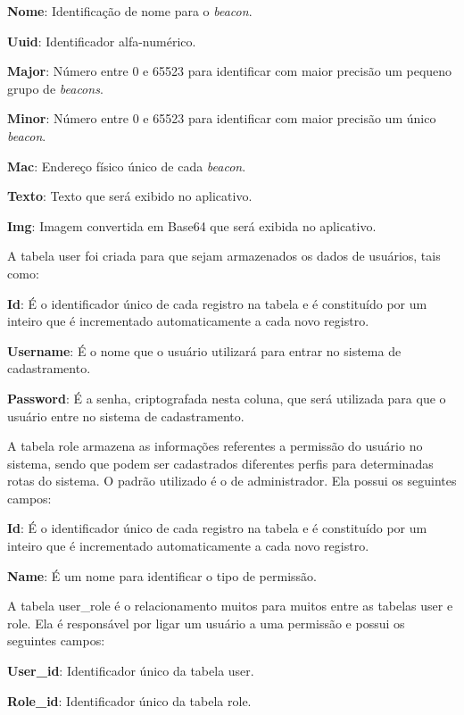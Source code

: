 \textbf{Nome}: Identificação de nome para o
\textit{beacon}.

\textbf{Uuid}: Identificador alfa-numérico.

\textbf{Major}: Número entre 0 e 65523 para identificar com maior precisão um pequeno grupo de \textit{beacons}.

\textbf{Minor}: Número entre 0 e 65523 para identificar com maior precisão um único \textit{beacon}.

\textbf{Mac}: Endereço físico único de cada \textit{beacon}.

\textbf{Texto}: Texto que será exibido no aplicativo.

\textbf{Img}: Imagem convertida em Base64 que será exibida no aplicativo.

A tabela user foi criada para que sejam armazenados os dados de usuários, tais como:

\textbf{Id}: É o identificador único de cada registro na tabela e é constituído por um inteiro que é incrementado automaticamente a cada novo registro.

\textbf{Username}: É o nome que o usuário utilizará para entrar no sistema de cadastramento.

\textbf{Password}: É a senha, criptografada nesta coluna, que será utilizada para que o usuário entre no sistema de cadastramento.

A tabela role armazena as informações referentes a permissão do usuário no sistema, sendo que podem ser cadastrados diferentes perfis para determinadas rotas do sistema. O padrão utilizado é o de administrador. Ela possui os seguintes campos:

\textbf{Id}: É o identificador único de cada registro na tabela e é constituído por um inteiro que é incrementado automaticamente a cada novo registro.

\textbf{Name}: É um nome para identificar o tipo de permissão.

A tabela user\_role é o relacionamento muitos para muitos entre as tabelas user e role. Ela é responsável por ligar um usuário a uma permissão e possui os seguintes campos: 

\textbf{User\_id}: Identificador único da tabela user.

\textbf{Role\_id}: Identificador único da tabela role.